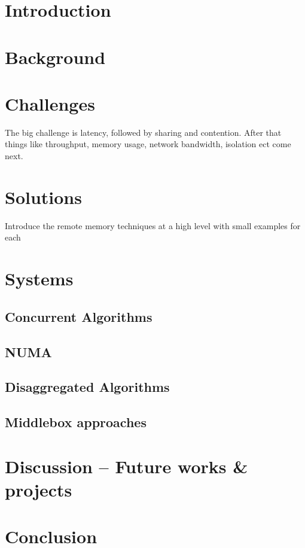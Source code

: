 \section{Introduction}

\section{Background}

\section{Challenges}

The big challenge is latency, followed by sharing and contention. After that
things like throughput, memory usage, network bandwidth, isolation ect come
next.

\section{Solutions}
Introduce the remote memory techniques at a high level with small examples for each

\section{Systems}
\subsection{Concurrent Algorithms}
\subsection{NUMA}
\subsection{Disaggregated Algorithms}
\subsection{Middlebox approaches}

\section{Discussion -- Future works \& projects}

\section{Conclusion}

